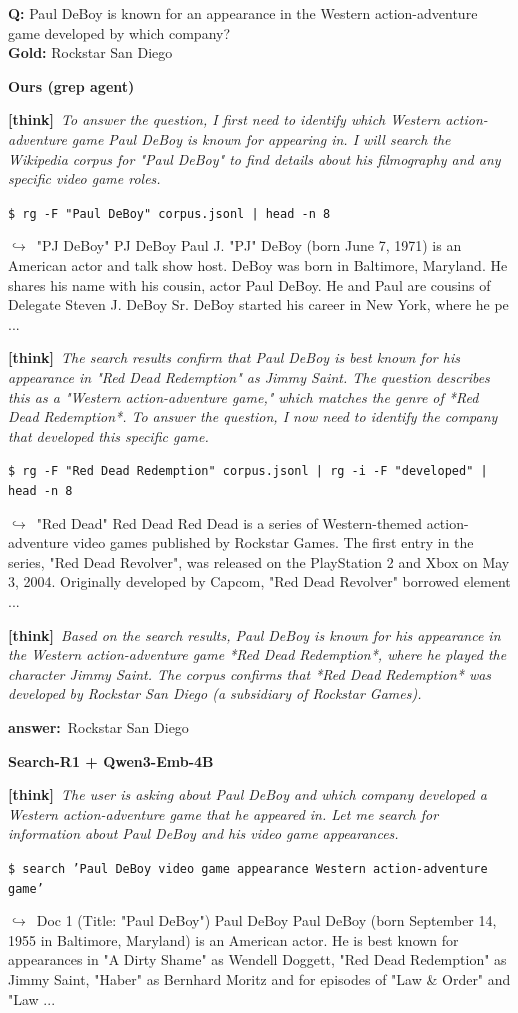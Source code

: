 \documentclass{article} %
\newcommand{\cmark}{\textcolor{green!45!black}{\ding{51}}}
\newcommand{\xmark}{\textcolor{red!60!black}{\ding{55}}}
\newcommand{\winbadge}{\colorbox{green!50!black}{\textcolor{white}{\scriptsize\bfseries\,WIN\,}}}
\newcommand{\thk}[1]{{\footnotesize\textcolor{violet!75!black}{\textbf{[think]}}\ \textit{#1}\par}}
\newcommand{\cmd}[1]{{\footnotesize\texttt{\textcolor{blue!35!black}{\$\ #1}}\par}}
\newcommand{\retr}[1]{{\footnotesize\textcolor{black!65}{\quad$\hookrightarrow$\ #1}\par}}
\newcommand{\ans}[1]{{\footnotesize\textbf{answer:}\ #1\par}}
\begin{document}
\begin{cmpbox}[label={ex:hotpot-rockstar},title={\winbadge\ \ \textsc{HotpotQA -- entity precision (subsidiary vs.\ parent)}}]
\textbf{Q:} Paul DeBoy is known for an appearance in the Western action-adventure game developed by which company?\\[1pt]
\textbf{Gold:} Rockstar San Diego\par\smallskip
\textbf{Ours (grep agent)}~\cmark\par
  \thk{To answer the question, I first need to identify which Western action-adventure game Paul DeBoy is known for appearing in. I will search the Wikipedia corpus for "Paul DeBoy" to find details about his filmography and any specific video game roles.}
  \cmd{rg -F "Paul DeBoy" corpus.jsonl | head -n 8}
  \retr{"PJ DeBoy" PJ DeBoy Paul J. "PJ" DeBoy (born June 7, 1971) is an American actor and talk show host. DeBoy was born in Baltimore, Maryland. He shares his name with his cousin, actor Paul DeBoy. He and Paul are cousins of Delegate Steven J. DeBoy Sr. DeBoy started his career in New York, where he pe ...}
  \thk{The search results confirm that Paul DeBoy is best known for his appearance in "Red Dead Redemption" as Jimmy Saint. The question describes this as a "Western action-adventure game," which matches the genre of *Red Dead Redemption*. To answer the question, I now need to identify the company that developed this specific game.}
  \cmd{rg -F "Red Dead Redemption" corpus.jsonl | rg -i -F "developed" | head -n 8}
  \retr{"Red Dead" Red Dead Red Dead is a series of Western-themed action-adventure video games published by Rockstar Games. The first entry in the series, "Red Dead Revolver", was released on the PlayStation 2 and Xbox on May 3, 2004. Originally developed by Capcom, "Red Dead Revolver" borrowed element ...}
  \thk{Based on the search results, Paul DeBoy is known for his appearance in the Western action-adventure game *Red Dead Redemption*, where he played the character Jimmy Saint. The corpus confirms that *Red Dead Redemption* was developed by Rockstar San Diego (a subsidiary of Rockstar Games).}
  \ans{Rockstar San Diego}
\smallskip\par\textbf{Search-R1 + Qwen3-Emb-4B}~\xmark\par
  \thk{The user is asking about Paul DeBoy and which company developed a Western action-adventure game that he appeared in. Let me search for information about Paul DeBoy and his video game appearances.}
  \cmd{search 'Paul DeBoy video game appearance Western action-adventure game'}
  \retr{Doc 1 (Title: "Paul DeBoy") Paul DeBoy Paul DeBoy (born September 14, 1955 in Baltimore, Maryland) is an American actor. He is best known for appearances in "A Dirty Shame" as Wendell Doggett, "Red Dead Redemption" as Jimmy Saint, "Haber" as Bernhard Moritz and for episodes of "Law \& Order" and "Law ...}

\end{cmpbox}
\end{document}
